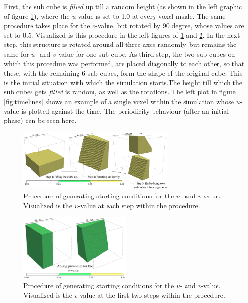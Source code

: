 First, the sub cube is \textit{filled} up till a random height (as shown in the left graphic of figure \ref{fig:u_evolution}), where the $u$-value is set to 1.0 at every voxel inside. The same procedure takes place for the $v$-value, but rotated by 90 degree, whose values are set to 0.5. Visualized is this procedure in the left figures of \ref{fig:u_evolution} and \ref{fig:v_evolution}. In the next step, this structure is rotated around all three axes randomly, but remains the same for $u$- and $v$-value for one sub cube. As third step, the two sub cubes on which this procedure was performed, are placed diagonally to each other, so that these, with the remaining 6 sub cubes, form the shape of the original cube. This is the initial situation with which the simulation starts.The height till which the sub cubes gets \textit{filled} is random, as well as the rotations. The left plot in figure \ref{fig:timelines} shows an example of a single voxel within the simulation whose $u$-value is plotted against the time. The periodicity behaviour (after an initial phase) can be seen here.

\begin{figure}[ht]
    \center
    \includegraphics[width=0.7\textwidth]{figures/u_evolution.png}
	\caption{Procedure of generating starting conditions for the $u$- and $v$-value. Visualized is the $u$-value at each step within the procedure.}
	\label{fig:u_evolution}
\end{figure}

\begin{figure}[h]
    \center
    \includegraphics[width=0.5\textwidth]{figures/v_evolution.png}
	\caption{Procedure of generating starting conditions for the $u$- and $v$-value. Visualized is the $v$-value at the first two steps within the procedure.}
	\label{fig:v_evolution}
\end{figure}


